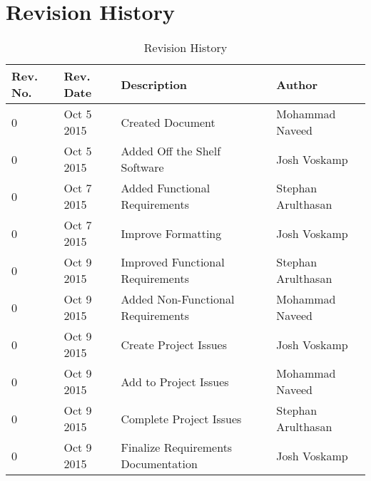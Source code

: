 \documentclass[12pt]{article}
\begin{document}
\begin{titlepage}



\vfill %

\end{titlepage}

\newpage
\tableofcontents
\newpage
\listoftables
{}
\newpage
\listoffigures
{}
\newpage

\section*{Revision History}
\begin{table}[H]
	\centering
	\begin{tabular}{ | p{2cm} |  p{2cm} | p{5cm} | p{3.8cm} |}
		\hline
		Rev. No. & Rev. Date & Description & Author \\\hline
		0 & Oct 5 2015 & Created Document & Mohammad Naveed \\\hline
		0 & Oct 5 2015 & Added Off the Shelf Software & Josh Voskamp \\\hline
		0 & Oct 7 2015 & Added Functional Requirements & Stephan Arulthasan\\\hline
		0 & Oct 7 2015 & Improve Formatting & Josh Voskamp \\\hline
		0 & Oct 9 2015 & Improved Functional Requirements & Stephan Arulthasan \\\hline
		0 & Oct 9 2015 & Added Non-Functional Requirements & Mohammad Naveed \\\hline
		0 & Oct 9 2015 & Create Project Issues & Josh Voskamp \\\hline
		0 & Oct 9 2015 & Add to Project Issues & Mohammad Naveed \\\hline
		0 & Oct 9 2015 & Complete Project Issues & Stephan Arulthasan \\\hline
		0 & Oct 9 2015 & Finalize Requirements Documentation & Josh Voskamp \\\hline
	\end{tabular}
	\caption{Revision History}
\end{table}
\newpage
\end{document}
